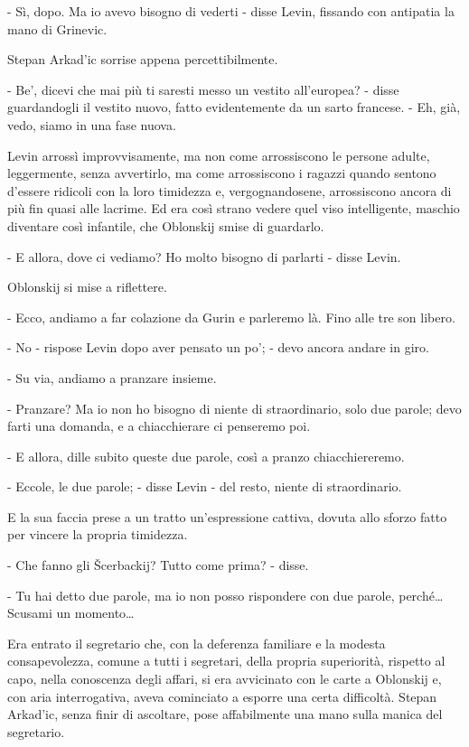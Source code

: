 - Sì, dopo. Ma io avevo bisogno di vederti - disse Levin, fissando con antipatia la mano di Grinevic. 

Stepan Arkad'ic sorrise appena percettibilmente. 

- Be', dicevi che mai più ti saresti messo un vestito all'europea? - disse guardandogli il vestito nuovo, fatto evidentemente da un sarto francese. - Eh, già, vedo, siamo in una fase nuova. 

Levin arrossì improvvisamente, ma non come arrossiscono le persone adulte, leggermente, senza avvertirlo, ma come arrossiscono i ragazzi quando sentono d'essere ridicoli con la loro timidezza e, vergognandosene, arrossiscono ancora di più fin quasi alle lacrime. Ed era così strano vedere quel viso intelligente, maschio diventare così infantile, che Oblonskij smise di guardarlo. 

- E allora, dove ci vediamo? Ho molto bisogno di parlarti - disse Levin. 

Oblonskij si mise a riflettere. 

- Ecco, andiamo a far colazione da Gurin e parleremo là. Fino alle tre son libero. 

- No - rispose Levin dopo aver pensato un po'; - devo ancora andare in giro. 

- Su via, andiamo a pranzare insieme. 

- Pranzare? Ma io non ho bisogno di niente di straordinario, solo due parole; devo farti una domanda, e a chiacchierare ci penseremo poi. 

- E allora, dille subito queste due parole, così a pranzo chiacchiereremo. 

- Eccole, le due parole; - disse Levin - del resto, niente di straordinario. 

E la sua faccia prese a un tratto un'espressione cattiva, dovuta allo sforzo fatto per vincere la propria timidezza. 

- Che fanno gli Šcerbackij? Tutto come prima? - disse. 

- Tu hai detto due parole, ma io non posso rispondere con due parole, perché\ldots{} Scusami un momento\ldots{} 

Era entrato il segretario che, con la deferenza familiare e la modesta consapevolezza, comune a tutti i segretari, della propria superiorità, rispetto al capo, nella conoscenza degli affari, si era avvicinato con le carte a Oblonskij e, con aria interrogativa, aveva cominciato a esporre una certa difficoltà. Stepan Arkad'ic, senza finir di ascoltare, pose affabilmente una mano sulla manica del segretario. 


